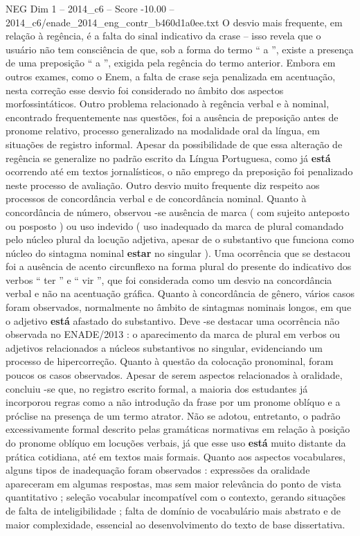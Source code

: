 \begin{textsample}{NEG Dim 1 – 2014\_c6 – Score -10.00 – 2014\_c6/enade\_2014\_eng\_contr\_b460d1a0ee.txt}
O desvio mais frequente, em relação à regência, é a falta do sinal indicativo da crase – isso revela que o usuário não tem consciência de que, sob a forma do termo “ a ”, existe a presença de uma preposição “ a ”, exigida pela regência do termo anterior.
Embora em outros exames, como o Enem, a falta de crase seja penalizada em acentuação, nesta correção esse desvio foi considerado no âmbito dos aspectos morfossintáticos.
Outro problema relacionado à regência verbal e à nominal, encontrado frequentemente nas questões, foi a ausência de preposição antes de pronome relativo, processo generalizado na modalidade oral da língua, em situações de registro informal.
Apesar da possibilidade de que essa alteração de regência se generalize no padrão escrito da Língua Portuguesa, como já \textbf{está} ocorrendo até em textos jornalísticos, o não emprego da preposição foi penalizado neste processo de avaliação.
Outro desvio muito frequente diz respeito aos processos de concordância verbal e de concordância nominal.
Quanto à concordância de número, observou -se ausência de marca ( com sujeito anteposto ou posposto ) ou uso indevido ( uso inadequado da marca de plural comandado pelo núcleo plural da locução adjetiva, apesar de o substantivo que funciona como núcleo do sintagma nominal \textbf{estar} no singular ).
Uma ocorrência que se destacou foi a ausência de acento circunflexo na forma plural do presente do indicativo dos verbos “ ter ” e “ vir ”, que foi considerada como um desvio na concordância verbal e não na acentuação gráfica.
Quanto à concordância de gênero, vários casos foram observados, normalmente no âmbito de sintagmas nominais longos, em que o adjetivo \textbf{está} afastado do substantivo.
Deve -se destacar uma ocorrência não observada no ENADE/2013 : o aparecimento da marca de plural em verbos ou adjetivos relacionados a núcleos substantivos no singular, evidenciando um processo de hipercorreção.
Quanto à questão da colocação pronominal, foram poucos os casos observados.
Apesar de serem aspectos relacionados à oralidade, concluiu -se que, no registro escrito formal, a maioria dos estudantes já incorporou regras como a não introdução da frase por um pronome oblíquo e a próclise na presença de um termo atrator.
Não se adotou, entretanto, o padrão excessivamente formal descrito pelas gramáticas normativas em relação à posição do pronome oblíquo em locuções verbais, já que esse uso \textbf{está} muito distante da prática cotidiana, até em textos mais formais.
Quanto aos aspectos vocabulares, alguns tipos de inadequação foram observados : expressões da oralidade apareceram em algumas respostas, mas sem maior relevância do ponto de vista quantitativo ; seleção vocabular incompatível com o contexto, gerando situações de falta de inteligibilidade ; falta de domínio de vocabulário mais abstrato e de maior complexidade, essencial ao desenvolvimento do texto de base dissertativa.

\end{textsample}
